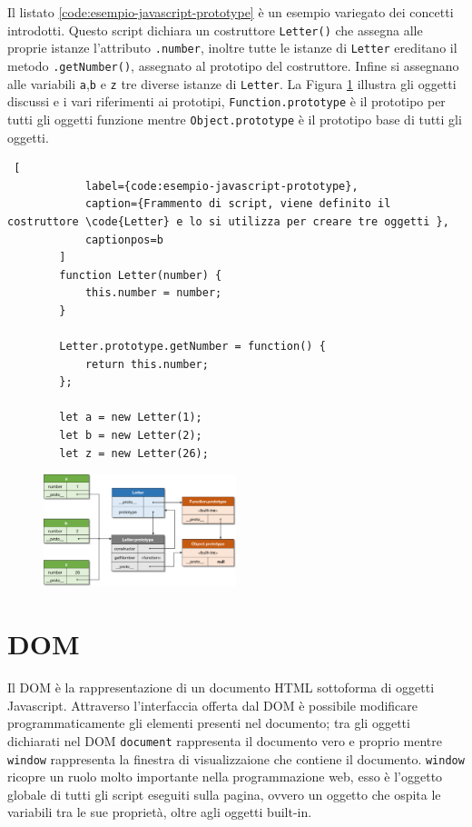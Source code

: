 \documentclass{sapthesis}
\newcommand{\code}[1]{\texttt{#1}}
\newcommand{\method}[1]{\code{.#1()}}
\newcommand{\attr}[1]{\code{.#1}}
\newcommand{\JS}{Javascript}
\begin{document}
        Il listato \ref{code:esempio-javascript-prototype} è un esempio variegato dei concetti introdotti.
        Questo script dichiara un costruttore \code{Letter()} che assegna alle proprie istanze l'attributo \attr{number},
        inoltre tutte le istanze di \code{Letter} ereditano il metodo \method{getNumber}, assegnato al prototipo del costruttore.
        Infine si assegnano alle variabili \code{a},\code{b} e \code{z} tre diverse istanze di \code{Letter}.
        La Figura \ref{fig:javascript-prototype} illustra gli oggetti discussi e i vari riferimenti ai prototipi, \code{Function.prototype}
        è il prototipo per tutti gli oggetti funzione mentre \code{Object.prototype} è il prototipo base di tutti gli oggetti.

        \begin{lstlisting} [
            label={code:esempio-javascript-prototype},
            caption={Frammento di script, viene definito il costruttore \code{Letter} e lo si utilizza per creare tre oggetti },
            captionpos=b
        ]
        function Letter(number) {
            this.number = number;
        }
        
        Letter.prototype.getNumber = function() {
            return this.number;
        };
        
        let a = new Letter(1);
        let b = new Letter(2);
        let z = new Letter(26);
        \end{lstlisting}
        
        \begin{figure}[ht]
            \centering                                                  
            \includegraphics[width=0.5\textwidth]{javascript-constructor.png}
            \caption{}
            \label{fig:javascript-prototype}  
        \end{figure}

    \section{DOM}
    \label{dom}
        Il DOM è la rappresentazione di un documento HTML sottoforma di oggetti \JS \cite{dom-introduction}. 
        Attraverso l'interfaccia offerta dal DOM è possibile modificare programmaticamente gli elementi presenti
        nel documento; tra gli oggetti dichiarati nel DOM \code{document} rappresenta il documento vero e proprio
        mentre \code{window} rappresenta la finestra di visualizzaione che contiene il documento.
        \code{window} ricopre un ruolo molto importante nella programmazione web, esso è l'oggetto globale 
        di tutti gli script eseguiti sulla pagina, ovvero un oggetto che ospita le variabili tra le
        sue proprietà, oltre agli oggetti built-in.
\end{document}
